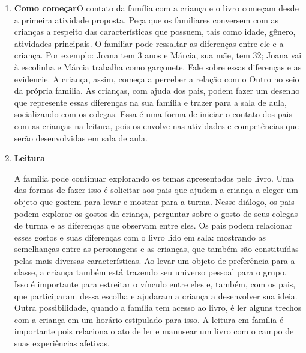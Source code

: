 \documentclass[11pt]{extarticle}
\begin{document}
\begin{enumerate}
\item \textbf{Como começar}\quad O contato da família com a criança e o livro começam desde a primeira atividade proposta. Peça que os familiares conversem com as crianças a respeito das características que possuem, tais como idade, gênero, atividades principais.
O familiar pode ressaltar as diferenças entre ele e a criança. Por exemplo: Joana tem 3 anos e Márcia, sua mãe, tem 32; Joana vai à escolinha e Márcia trabalha como garçonete.
Fale sobre essas diferenças e as evidencie. A criança, assim, começa a perceber a relação com o Outro no seio da própria família. As crianças, com ajuda dos pais, podem fazer um desenho que represente essas diferenças na sua família e trazer para a sala de aula, socializando com os colegas.
Essa é uma forma de iniciar o contato dos pais com as crianças na leitura, pois os envolve nas atividades e competências que serão desenvolvidas em sala de aula.

\item \textbf{Leitura}\quad 

A família pode continuar 
explorando os temas apresentados pelo livro. Uma das formas de fazer isso é solicitar aos pais que ajudem a criança a eleger um objeto que gostem para levar e mostrar para a turma.
Nesse diálogo, os pais podem explorar os gostos da criança, perguntar sobre o gosto de seus colegas de turma e as diferenças que observam entre eles. Os pais podem relacionar esses gostos e suas diferenças com o livro lido em sala: mostrando as semelhanças entre as personagens e as crianças, que também são constituídas pelas mais diversas características.
Ao levar um objeto de preferência para a classe, a criança também está trazendo seu universo pessoal para o grupo. Isso é importante para estreitar o vínculo entre eles e, também, com os pais, que participaram dessa escolha e ajudaram a criança a desenvolver sua ideia.
Outra possibilidade, quando a família tem acesso ao livro, é ler alguns trechos com a criança em um horário estipulado para isso. A leitura em família é importante pois relaciona o ato de ler e manusear um livro com o campo de suas experiências afetivas.


\end{enumerate}
\end{document}
